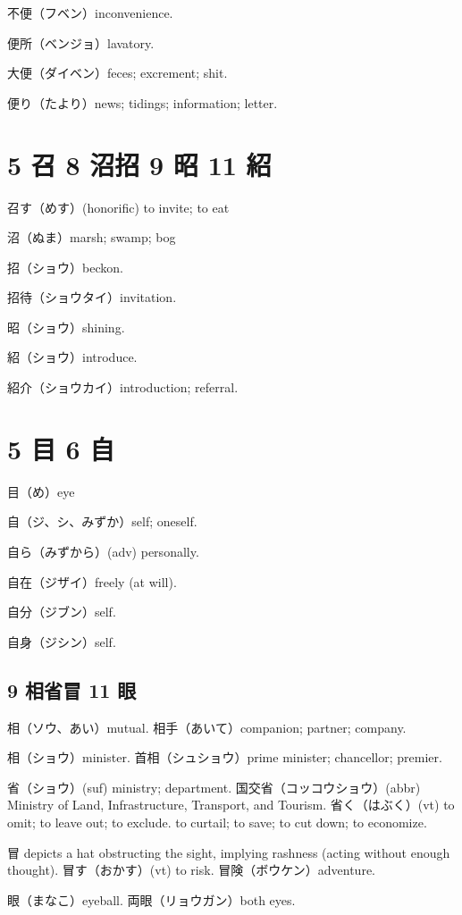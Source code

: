 不便（フベン）inconvenience.

便所（ベンジョ）lavatory.

大便（ダイベン）feces; excrement; shit.

便り（たより）news; tidings; information; letter.

\section{5 召 8 沼招 9 昭 11 紹}

召す（めす）(honorific) to invite; to eat

沼（ぬま）marsh; swamp; bog

招（ショウ）beckon.

招待（ショウタイ）invitation.

昭（ショウ）shining.

紹（ショウ）introduce.

紹介（ショウカイ）introduction; referral.

\section{5 目 6 自}

目（め）eye

自（ジ、シ、みずか）self; oneself.

自ら（みずから）(adv) personally.

自在（ジザイ）freely (at will).

自分（ジブン）self.

自身（ジシン）self.

\subsection{9 相省冒 11 眼}

相（ソウ、あい）mutual.
相手（あいて）companion; partner; company.

相（ショウ）minister.
首相（シュショウ）prime minister; chancellor; premier.

省（ショウ）(suf) ministry; department.
国交省（コッコウショウ）(abbr)
Ministry of Land, Infrastructure, Transport, and Tourism.
省く（はぶく）(vt)
to omit; to leave out; to exclude.
to curtail; to save; to cut down; to economize.

冒 depicts a hat obstructing the sight, implying rashness
(acting without enough thought).
冒す（おかす）(vt) to risk.
冒険（ボウケン）adventure.

眼（まなこ）eyeball.
両眼（リョウガン）both eyes.

